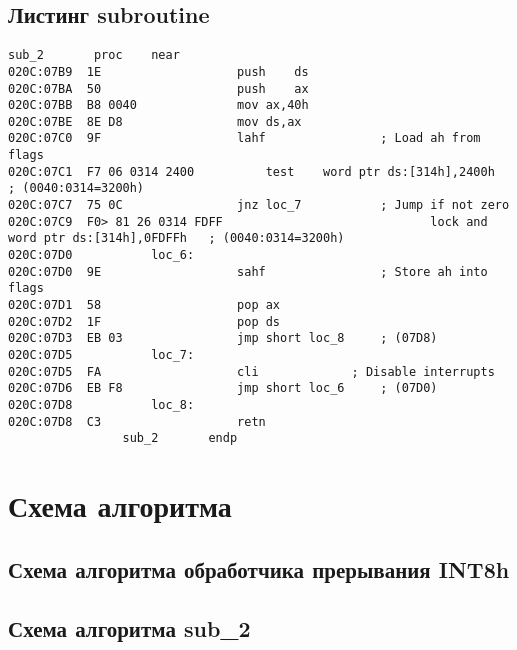 \subsection*{Листинг subroutine} 
\begin{lstlisting}[style={asm}]
				sub_2		proc	near
020C:07B9  1E					push	ds
020C:07BA  50					push	ax
020C:07BB  B8 0040				mov	ax,40h
020C:07BE  8E D8				mov	ds,ax
020C:07C0  9F					lahf				; Load ah from flags
020C:07C1  F7 06 0314 2400			test	word ptr ds:[314h],2400h	; (0040:0314=3200h)
020C:07C7  75 0C				jnz	loc_7			; Jump if not zero
020C:07C9  F0> 81 26 0314 FDFF	                           lock	and	word ptr ds:[314h],0FDFFh	; (0040:0314=3200h)
020C:07D0			loc_6:
020C:07D0  9E					sahf				; Store ah into flags
020C:07D1  58					pop	ax
020C:07D2  1F					pop	ds
020C:07D3  EB 03				jmp	short loc_8		; (07D8)
020C:07D5			loc_7:
020C:07D5  FA					cli				; Disable interrupts
020C:07D6  EB F8				jmp	short loc_6		; (07D0)
020C:07D8			loc_8:
020C:07D8  C3					retn
				sub_2		endp
\end{lstlisting}

\newpage
\section*{Схема алгоритма}
\subsection*{Схема алгоритма обработчика прерывания INT8h}
\newpage
{}
\newpage
{}
\newpage
{}
\newpage

\subsection*{Схема алгоритма sub\_2}
